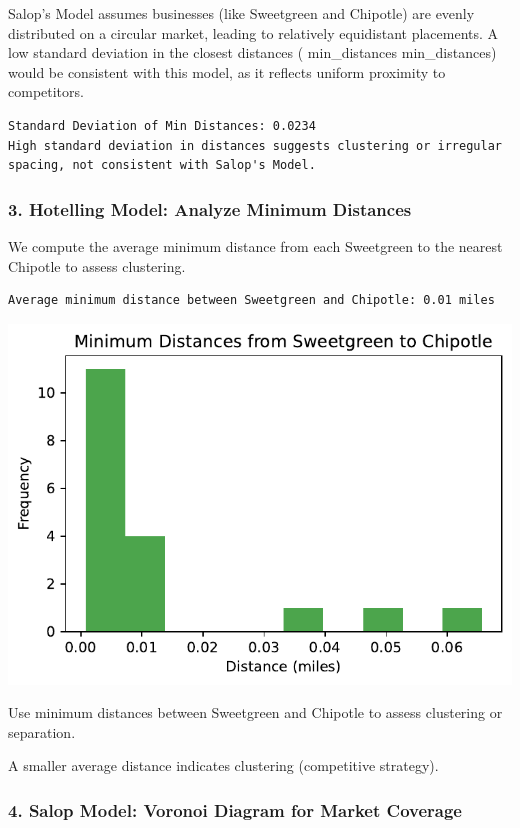 \documentclass[
  letterpaper,
  DIV=11,
  numbers=noendperiod]{scrartcl}
\begin{document}
Salop's Model assumes businesses (like Sweetgreen and Chipotle) are
evenly distributed on a circular market, leading to relatively
equidistant placements. A low standard deviation in the closest
distances ( min\_distances min\_distances) would be consistent with this
model, as it reflects uniform proximity to competitors.

\begin{verbatim}
Standard Deviation of Min Distances: 0.0234
High standard deviation in distances suggests clustering or irregular spacing, not consistent with Salop's Model.
\end{verbatim}

\subsubsection{3. Hotelling Model: Analyze Minimum
Distances}\label{hotelling-model-analyze-minimum-distances}

We compute the average minimum distance from each Sweetgreen to the
nearest Chipotle to assess clustering.

\begin{verbatim}
Average minimum distance between Sweetgreen and Chipotle: 0.01 miles
\end{verbatim}

\includegraphics{index_files/figure-pdf/cell-11-output-2.pdf}

Use minimum distances between Sweetgreen and Chipotle to assess
clustering or separation.

A smaller average distance indicates clustering (competitive strategy).

\subsubsection{4. Salop Model: Voronoi Diagram for Market
Coverage}\label{salop-model-voronoi-diagram-for-market-coverage}
\end{document}
